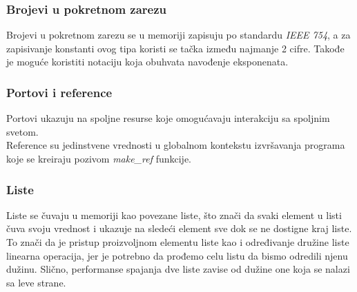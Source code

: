 \documentclass[12pt,oneside]{memoir}
\begin{document}
\subsubsection{Brojevi u pokretnom zarezu}
Brojevi u pokretnom zarezu se u memoriji zapisuju po standardu \textit{IEEE 754}, a za zapisivanje konstanti ovog tipa koristi se tačka između najmanje 2 cifre. Takođe je moguće koristiti notaciju koja obuhvata navođenje eksponenata.\\

\begin{comment}
\subsubsection{Procesi}
U Eliksiru se sav kod pokreće unutar procesa. Procesi su izolovani jedni od drugih, spajaju se jedan sa drugima i komuniciraju putem slanja poruka. Procesi nisu samo osnova za konkurentnost u Elixir-u, već i sredstva za izgradnju distribuiranih i tolerantnih programa.
Procese Elixir-a ne treba mešati sa procesima operativnog sistema. Procesi Eliksira su izuzetno lagani u smislu memorije i CPU-a (čak i u poređenju sa nitima koji se koriste u mnogim drugim programskim jezicima). Zbog toga nije neuobičajeno da se istovremeno odvijaju desetine ili čak stotine hiljada procesa.\\
\end{comment}

\subsubsection{Portovi i reference}
Portovi ukazuju na spoljne resurse koje omogućavaju interakciju sa spoljnim svetom.\\

Reference su jedinstvene vrednosti u globalnom kontekstu izvršavanja programa koje se kreiraju pozivom \textit{make\_ref} funkcije.\\

\subsubsection{Liste}
Liste se čuvaju u memoriji kao povezane liste, što znači da svaki element u listi čuva svoju vrednost i ukazuje na sledeći element sve dok se ne dostigne kraj liste. To znači da je pristup proizvoljnom elementu liste kao i određivanje družine liste linearna operacija, jer je potrebno da prođemo celu listu da bismo odredili njenu dužinu. Slično, performanse spajanja dve liste zavise od dužine one koja se nalazi sa leve strane. 
\end{document}

